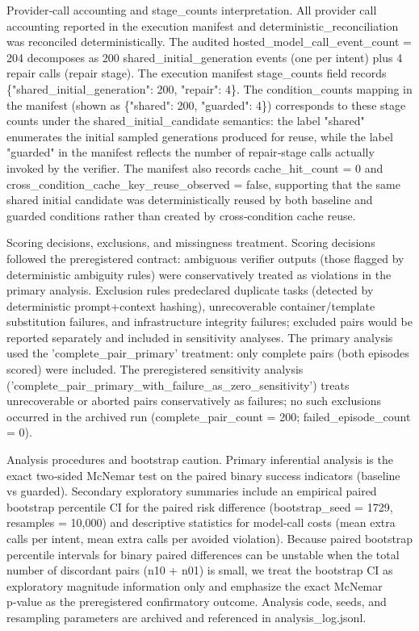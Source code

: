 \documentclass[conference]{IEEEtran}
\begin{document}
Provider‑call accounting and stage\_counts interpretation. All provider call accounting reported in the execution manifest and deterministic\_reconciliation was reconciled deterministically. The audited hosted\_model\_call\_event\_count = 204 decomposes as 200 shared\_initial\_generation events (one per intent) plus 4 repair calls (repair stage). The execution manifest stage\_counts field records \{"shared\_initial\_generation": 200, "repair": 4\}. The condition\_counts mapping in the manifest (shown as \{"shared": 200, "guarded": 4\}) corresponds to these stage counts under the shared\_initial\_candidate semantics: the label "shared" enumerates the initial sampled generations produced for reuse, while the label "guarded" in the manifest reflects the number of repair‑stage calls actually invoked by the verifier. The manifest also records cache\_hit\_count = 0 and cross\_condition\_cache\_key\_reuse\_observed = false, supporting that the same shared initial candidate was deterministically reused by both baseline and guarded conditions rather than created by cross‑condition cache reuse.

Scoring decisions, exclusions, and missingness treatment. Scoring decisions followed the preregistered contract: ambiguous verifier outputs (those flagged by deterministic ambiguity rules) were conservatively treated as violations in the primary analysis. Exclusion rules predeclared duplicate tasks (detected by deterministic prompt+context hashing), unrecoverable container/template substitution failures, and infrastructure integrity failures; excluded pairs would be reported separately and included in sensitivity analyses. The primary analysis used the 'complete\_pair\_primary' treatment: only complete pairs (both episodes scored) were included. The preregistered sensitivity analysis ('complete\_pair\_primary\_with\_failure\_as\_zero\_sensitivity') treats unrecoverable or aborted pairs conservatively as failures; no such exclusions occurred in the archived run (complete\_pair\_count = 200; failed\_episode\_count = 0).

Analysis procedures and bootstrap caution. Primary inferential analysis is the exact two‑sided McNemar test on the paired binary success indicators (baseline vs guarded). Secondary exploratory summaries include an empirical paired bootstrap percentile CI for the paired risk difference (bootstrap\_seed = 1729, resamples = 10,000) and descriptive statistics for model‑call costs (mean extra calls per intent, mean extra calls per avoided violation). Because paired bootstrap percentile intervals for binary paired differences can be unstable when the total number of discordant pairs (n10 + n01) is small, we treat the bootstrap CI as exploratory magnitude information only and emphasize the exact McNemar p‑value as the preregistered confirmatory outcome. Analysis code, seeds, and resampling parameters are archived and referenced in analysis\_log.jsonl.
\end{document}
